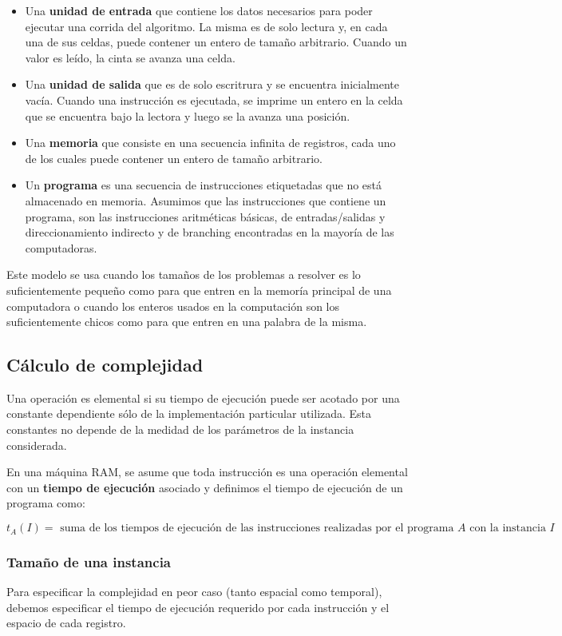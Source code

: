 \begin{itemize}
	\item Una \textbf{unidad de entrada} que contiene los datos necesarios para poder ejecutar una corrida del algoritmo. La misma es de solo lectura y, en cada una de sus celdas, puede contener un entero de tamaño arbitrario. Cuando un valor es leído, la cinta se avanza una celda.
	\item Una \textbf{unidad de salida} que es de solo escritrura y se encuentra inicialmente vacía. Cuando una instrucción es ejecutada, se imprime un entero en la celda que se encuentra bajo la lectora y luego se la avanza una posición.
	\item Una \textbf{memoria} que consiste en una secuencia infinita de registros, cada uno de los cuales puede contener un entero de tamaño arbitrario. 
	\item Un \textbf{programa} es una secuencia de instrucciones etiquetadas que no está almacenado en memoria. Asumimos que las instrucciones que contiene un programa, son las instrucciones aritméticas básicas, de entradas/salidas y direccionamiento indirecto y de branching encontradas en la mayoría de las computadoras.
\end{itemize}

Este modelo se usa cuando los tamaños de los problemas a resolver es lo suficientemente pequeño como para que entren en la memoría principal de una computadora o cuando los enteros usados en la computación son los suficientemente chicos como para que entren en una palabra de la misma.

\subsection{Cálculo de complejidad}
Una operación es elemental si su tiempo de ejecución puede ser acotado por una constante dependiente sólo de la implementación particular utilizada. Esta constantes no depende de la medidad de los parámetros de la instancia considerada.

En una máquina RAM, se asume que toda instrucción es una operación elemental con un \textbf{tiempo de ejecución} asociado y definimos el tiempo de ejecución de un programa como:

\[t_A(I) = \text{ suma de los tiempos de ejecución de las instrucciones realizadas por el programa } 
A \text{ con la instancia } I\]

\subsubsection{Tamaño de una instancia}
Para especificar la complejidad en peor caso (tanto espacial como temporal), debemos especificar el tiempo de ejecución requerido por cada instrucción y el espacio de cada registro.

